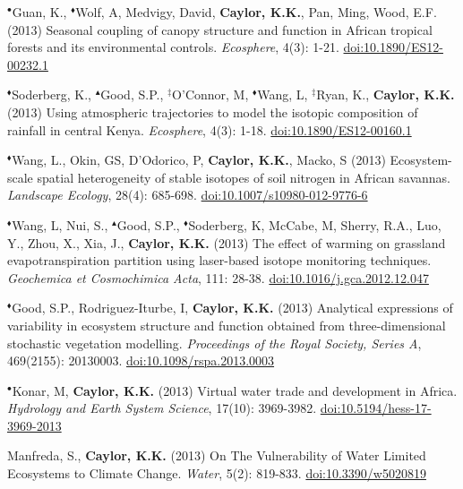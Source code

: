 \begin{etaremune}
\item $^{\bullet}$Guan, K., $^{\blacklozenge}$Wolf, A, Medvigy, David, \textbf{ Caylor, K.K.}, Pan, Ming, Wood, E.F. (2013) Seasonal coupling of canopy structure and function in African tropical forests and its environmental controls. \emph{Ecosphere}, 4(3): 1-21. \href{https://doi.org/10.1890/ES12-00232.1}{doi:10.1890/ES12-00232.1}
\item $^{\blacklozenge}$Soderberg, K., $^{\blacktriangle}$Good, S.P., $^{\ddagger}$O'Connor, M, $^{\blacklozenge}$Wang, L, $^{\ddagger}$Ryan, K., \textbf{ Caylor, K.K.} (2013) Using atmospheric trajectories to model the isotopic composition of rainfall in central Kenya. \emph{Ecosphere}, 4(3): 1-18. \href{https://doi.org/10.1890/ES12-00160.1}{doi:10.1890/ES12-00160.1}
\item $^{\blacklozenge}$Wang, L., Okin, GS, D'Odorico, P, \textbf{ Caylor, K.K.}, Macko, S (2013) Ecosystem-scale spatial heterogeneity of stable isotopes of soil nitrogen in African savannas. \emph{Landscape Ecology}, 28(4): 685-698. \href{https://doi.org/10.1007/s10980-012-9776-6}{doi:10.1007/s10980-012-9776-6}
\item $^{\blacklozenge}$Wang, L, Nui, S., $^{\blacktriangle}$Good, S.P., $^{\blacklozenge}$Soderberg, K, McCabe, M, Sherry, R.A., Luo, Y., Zhou, X., Xia, J., \textbf{ Caylor, K.K.} (2013) The effect of warming on grassland evapotranspiration partition using laser-based isotope monitoring techniques. \emph{Geochemica et Cosmochimica Acta}, 111: 28-38. \href{https://doi.org/10.1016/j.gca.2012.12.047}{doi:10.1016/j.gca.2012.12.047}
\item $^{\blacklozenge}$Good, S.P., Rodriguez-Iturbe, I, \textbf{ Caylor, K.K.} (2013) Analytical expressions of variability in ecosystem structure and function obtained from three-dimensional stochastic vegetation modelling. \emph{Proceedings of the Royal Society, Series A}, 469(2155): 20130003. \href{https://doi.org/10.1098/rspa.2013.0003}{doi:10.1098/rspa.2013.0003}
\item $^{\bullet}$Konar, M, \textbf{ Caylor, K.K.} (2013) Virtual water trade and development in Africa. \emph{Hydrology and Earth System Science}, 17(10): 3969-3982. \href{https://doi.org/10.5194/hess-17-3969-2013}{doi:10.5194/hess-17-3969-2013}
\item Manfreda, S., \textbf{ Caylor, K.K.} (2013) On The Vulnerability of Water Limited Ecosystems to Climate Change. \emph{Water}, 5(2): 819-833. \href{https://doi.org/10.3390/w5020819}{doi:10.3390/w5020819}


\end{etaremune}

